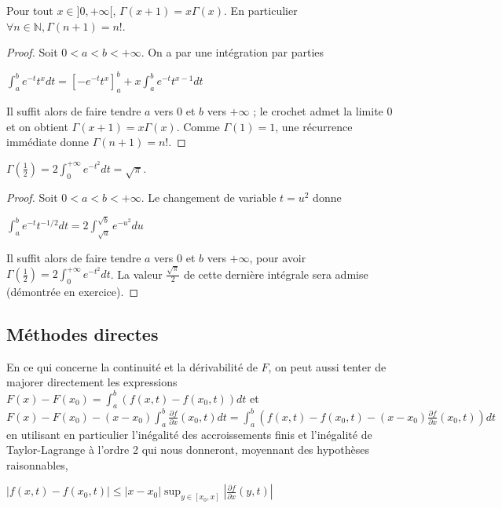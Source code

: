     \begin{prop}
    Pour tout $x \in ]0,+\infty[$, $\Gamma(x + 1) = x \Gamma(x)$. En particulier $\forall n \in \mathbb{N}, \Gamma(n + 1) = n!$.
    \end{prop}
    
    \begin{proof}
    Soit $0 < a < b < +\infty$. On a par une intégration par parties
    
    $\int_a^b e^{-t} t^x dt = \left[-e^{-t} t^x\right]_a^b + x \int_a^b e^{-t} t^{x-1} dt$
    
    Il suffit alors de faire tendre $a$ vers $0$ et $b$ vers $+\infty$ ; le crochet admet la limite $0$ et on obtient $\Gamma(x + 1) = x \Gamma(x)$. Comme $\Gamma(1) = 1$, une récurrence immédiate donne $\Gamma(n + 1) = n!$.
    \end{proof}
    
    \begin{prop}
    $\Gamma(\frac{1}{2}) = 2 \int_0^{+\infty} e^{-t^2} dt = \sqrt{\pi}$.
    \end{prop}
    
    \begin{proof}
    Soit $0 < a < b < +\infty$. Le changement de variable $t = u^2$ donne
    
    $\int_a^b e^{-t} t^{-1/2} dt = 2 \int_{\sqrt{a}}^{\sqrt{b}} e^{-u^2} du$
    
    Il suffit alors de faire tendre $a$ vers $0$ et $b$ vers $+\infty$, pour avoir $\Gamma(\frac{1}{2}) = 2 \int_0^{+\infty} e^{-t^2} dt$. La valeur $\frac{\sqrt{\pi}}{2}$ de cette dernière intégrale sera admise (démontrée en exercice).
    \end{proof}
    
    \subsection{Méthodes directes}
    
    En ce qui concerne la continuité et la dérivabilité de $F$, on peut aussi tenter de majorer directement les expressions $F(x) - F(x_0) = \int_a^b (f(x,t) - f(x_0,t)) dt$ et $F(x) - F(x_0) - (x - x_0) \int_a^b \frac{\partial f}{\partial x}(x_0,t) dt = \int_a^b \left(f(x,t) - f(x_0,t) - (x - x_0) \frac{\partial f}{\partial x}(x_0,t)\right) dt$ en utilisant en particulier l'inégalité des accroissements finis et l'inégalité de Taylor-Lagrange à l'ordre 2 qui nous donneront, moyennant des hypothèses raisonnables,
    
    $|f(x,t) - f(x_0,t)| \leq |x - x_0| \sup_{y \in [x_0,x]} |\frac{\partial f}{\partial x}(y,t)|$
    
